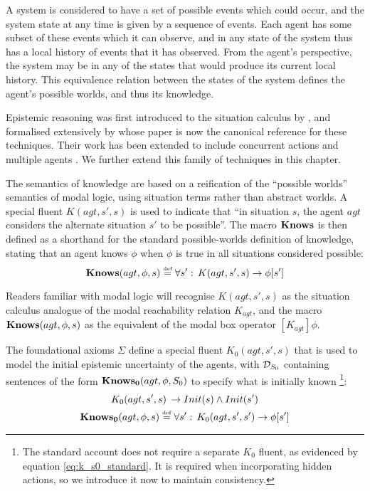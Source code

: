 A system is considered to have a set of possible events which could
occur, and the system state at any time is given by a sequence of
events. Each agent has some subset of these events which it can observe,
and in any state of the system thus has a local history of events
that it has observed. From the agent's perspective, the system may
be in any of the states that would produce its current local history.
This equivalence relation between the states of the system defines
the agent's possible worlds, and thus its knowledge.

Epistemic reasoning was first introduced to the situation calculus
by \citet{moore80know_act}, and formalised extensively by \citet{scherl03sc_knowledge}
whose paper is now the canonical reference for these techniques. Their
work has been extended to include concurrent actions \citep{scherl03conc_knowledge}
and multiple agents \citep{shapiro98specifying_ma_systems}. We further
extend this family of techniques in this chapter.

The semantics of knowledge are based on a reification of the {}``possible
worlds'' semantics of modal logic, using situation terms rather than
abstract worlds. A special fluent $K(agt,s',s)$ is used to indicate
that {}``in situation $s$, the agent $agt$ considers the alternate
situation $s'$ to be possible''. The macro $\mathbf{Knows}$ is then defined
as a shorthand for the standard possible-worlds definition of knowledge,
stating that an agent knows $\phi$ when $\phi$ is true in all situations
considered possible: \begin{equation}
\mathbf{Knows}(agt,\phi,s)\stackrel{\mbox{\tiny def}}{=}\forall s':\, K(agt,s',s)\rightarrow\phi[s']\label{eqn:Background:knows_def}\end{equation}


Readers familiar with modal logic will recognise $K(agt,s',s)$ as
the situation calculus analogue of the modal reachability relation
$K_{agt}$, and the macro $\mathbf{Knows}(agt,\phi,s)$ as the equivalent
of the modal box operator $[K_{agt}]\phi$.

The foundational axioms $\Sigma$ define a special fluent $K_{0}(agt,s',s)$
that is used to model the initial epistemic uncertainty of the agents,
with $\mathcal{D}_{S_{0}}$ containing sentences of the form $\mathbf{Knows_{0}}(agt,\phi,S_{0})$
to specify what is initially known%
\footnote{The standard account does not require a separate $K_{0}$ fluent,
as evidenced by equation \eqref{eq:k_s0_standard}. It is required
when incorporating hidden actions, so we introduce it now to maintain
consistency. %
}:\begin{gather*}
K_{0}(agt,s',s)\,\rightarrow Init(s)\wedge Init(s')\\
\mathbf{Knows_{0}}(agt,\phi,s)\stackrel{\mbox{\tiny def}}{=}\forall s':\, K_{0}(agt,s',s')\rightarrow\phi[s']\end{gather*}


